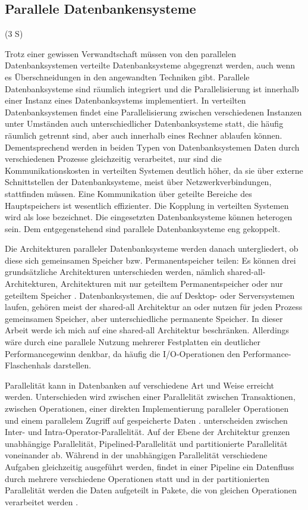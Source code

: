 \documentclass[a4paper,12pt,twoside]{article}
\begin{document}
\subsection{Parallele Datenbankensysteme} (3 S)
\label{P_DBS} 

Trotz einer gewissen Verwandtschaft müssen von den parallelen Datenbanksystemen verteilte Datenbanksysteme abgegrenzt werden, auch wenn es Überschneidungen in den angewandten Techniken gibt. Parallele Datenbanksysteme sind räumlich integriert und die Parallelisierung ist innerhalb einer Instanz eines Datenbanksystems implementiert. In verteilten Datenbanksystemen findet eine Parallelisierung zwischen verschiedenen Instanzen unter Umständen auch unterschiedlicher Datenbanksysteme statt, die häufig räumlich getrennt sind, aber auch innerhalb eines Rechner ablaufen können. Dementsprechend werden in beiden Typen von Datenbanksystemen Daten durch verschiedenen Prozesse gleichzeitig verarbeitet, nur sind die Kommunikationskosten in verteilten Systemen deutlich höher, da sie über externe Schnittstellen der Datenbanksysteme, meist über Netzwerkverbindungen, stattfinden müssen. Eine Kommunikation über geteilte Bereiche des Hauptspeichers ist wesentlich effizienter. Die Kopplung in verteilten Systemen wird als lose bezeichnet. Die eingesetzten Datenbanksysteme können heterogen sein. Dem entgegenstehend sind parallele Datenbanksysteme eng gekoppelt.

Die Architekturen paralleler Datenbanksysteme werden danach untergliedert, ob diese sich gemeinsamen Speicher bzw. Permanentspeicher teilen: Es können drei grundsätzliche Architekturen unterschieden werden, nämlich shared-all-Architekturen, Architekturen mit nur geteiltem Permanentspeicher oder nur geteiltem Speicher {\autocite{Yu1998}}. Datenbanksystemen, die auf Desktop- oder Serversystemen laufen, gehören meist der shared-all Architektur an oder nutzen für jeden Prozess gemeinsamen Speicher, aber unterschiedliche permanente Speicher. In dieser Arbeit werde ich mich auf eine shared-all Architektur beschränken. Allerdings wäre durch eine parallele Nutzung mehrerer Festplatten ein deutlicher Performancegewinn denkbar, da häufig die I/O-Operationen den Performance-Flaschenhals darstellen.

Parallelität kann in Datenbanken auf verschiedene Art und Weise erreicht werden. Unterschieden wird zwischen einer Parallelität zwischen Transaktionen, zwischen Operationen, einer direkten Implementierung paralleler Operationen und einem parallelem Zugriff auf gespeicherte Daten {\autocite{Reuter1999}}. {\textcite [S. 1]{Yu1998}} unterscheiden zwischen Inter- und Intra-Operator-Parallelität. Auf der Ebene der Architektur grenzen {\textcite{Yu1998}} unabhängige Parallelität, Pipelined-Parallelität und partitionierte Parallelität voneinander ab. Während in der unabhängigen Parallelität verschiedene Aufgaben gleichzeitig ausgeführt werden, findet in einer Pipeline ein Datenfluss durch mehrere verschiedene Operationen statt und in der partitionierten Parallelität werden die Daten aufgeteilt in Pakete, die von gleichen Operationen verarbeitet werden {\autocite{DeWitt1992}}.
\end{document}
